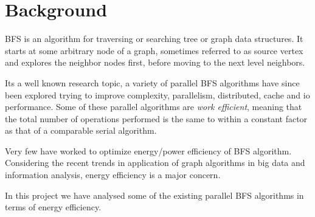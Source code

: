 \section{Background}
\label{bg}

%
%
%
%
%
%
%

BFS is an algorithm for traversing or searching tree or graph data structures.
It starts at some arbitrary node of a graph, sometimes referred to as source
vertex and explores the neighbor nodes first, before moving to the next level
neighbors.

Its a well known research topic, a variety of parallel BFS algorithms have
since been explored trying to improve complexity, parallelism, distributed,
cache and io performance. Some of these parallel algorithms are \emph{work
efficient}, meaning that the total number of operations performed is the same
to within a constant factor as that of a comparable serial algorithm. 

Very few have worked to optimize energy/power efficiency of BFS algorithm.
Considering the recent trends in application of graph algorithms in big data
and information analysis, energy efficiency is a major concern.

In this project we have analysed some of the existing parallel BFS algorithms
in terms of energy efficiency.


